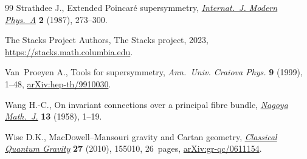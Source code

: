 \documentclass[pdftex]{sigma}
\numberwithin{equation}{section}
\newcommand{\1}{\mathbbm{1}}
\begin{document}
\begin{thebibliography}{99}
Strathdee J., Extended {P}oincar\'e supersymmetry,
 \href{https://doi.org/10.1142/S0217751X87000120}{\textit{Internat.~J. Modern
 Phys.~A}} \textbf{2} (1987), 273--300.

{The Stacks Project Authors}, The Stacks project, 2023, \url{https://stacks.math.columbia.edu}.

Van~Proeyen A., Tools for supersymmetry, \textit{Ann.~Univ. Craiova Phys.}
 \textbf{9} (1999), 1--48,
 \href{http://arxiv.org/abs/hep-th/9910030}{arXiv:hep-th/9910030}.

Wang H.-C., On invariant connections over a principal fibre bundle,
 \href{https://doi.org/10.1017/S0027763000023461}{\textit{Nagoya Math.~J.}}
 \textbf{13} (1958), 1--19.

Wise D.K., Mac{D}owell--{M}ansouri gravity and {C}artan geometry,
 \href{https://doi.org/10.1088/0264-9381/27/15/155010}{\textit{Classical
 Quantum Gravity}} \textbf{27} (2010), 155010, 26~pages,
 \href{http://arxiv.org/abs/gr-qc/0611154}{arXiv:gr-qc/0611154}.

\end{thebibliography}\LastPageEnding
\end{document}
